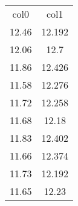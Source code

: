 \begin{table}
\begin{tabular}{cc}
col0 & col1 \\
12.46 & 12.192 \\
12.06 & 12.7 \\
11.86 & 12.426 \\
11.58 & 12.276 \\
11.72 & 12.258 \\
11.68 & 12.18 \\
11.83 & 12.402 \\
11.66 & 12.374 \\
11.73 & 12.192 \\
11.65 & 12.23 \\
\end{tabular}
\end{table}
